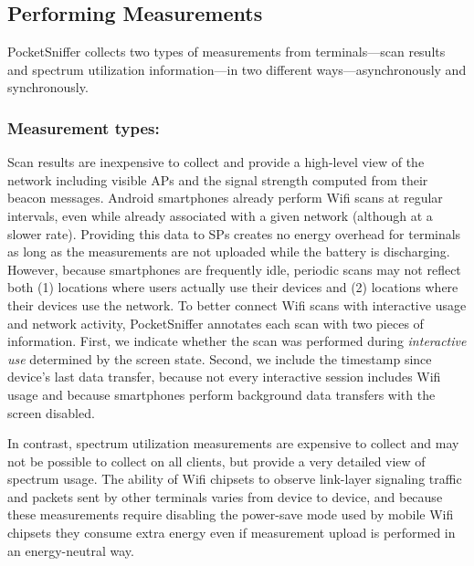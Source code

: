 \subsection{Performing Measurements}
\label{subsec-measurement}

PocketSniffer collects two types of measurements from terminals---scan
results and spectrum utilization information---in two different
ways---asynchronously and synchronously.

\subsubsection{Measurement types:\space} Scan results are inexpensive to
collect and provide a high-level view of the network including visible APs
and the signal strength computed from their beacon messages. Android
smartphones already perform Wifi scans at regular intervals, even while
already associated with a given network (although at a slower rate).
Providing this data to SPs creates no energy overhead for terminals as long
as the measurements are not uploaded while the battery is discharging.
However, because smartphones are frequently idle, periodic scans may not
reflect both (1) locations where users actually use their devices and (2)
locations where their devices use the network. To better connect Wifi scans
with interactive usage and network activity, PocketSniffer annotates each
scan with two pieces of information. First, we indicate whether the scan was
performed during \textit{interactive use} determined by the screen state.
Second, we include the timestamp since device's last data transfer, because
not every interactive session includes Wifi usage and because smartphones
perform background data transfers with the screen disabled.

In contrast, spectrum utilization measurements are expensive to
collect and may not be possible to collect on all clients, but provide
a very detailed view of spectrum usage. The ability of Wifi chipsets
to observe link-layer signaling traffic and packets sent by other
terminals varies from device to device, and because these measurements
require disabling the power-save mode used by mobile Wifi chipsets
they consume extra energy even if measurement upload is performed in
an energy-neutral way.


